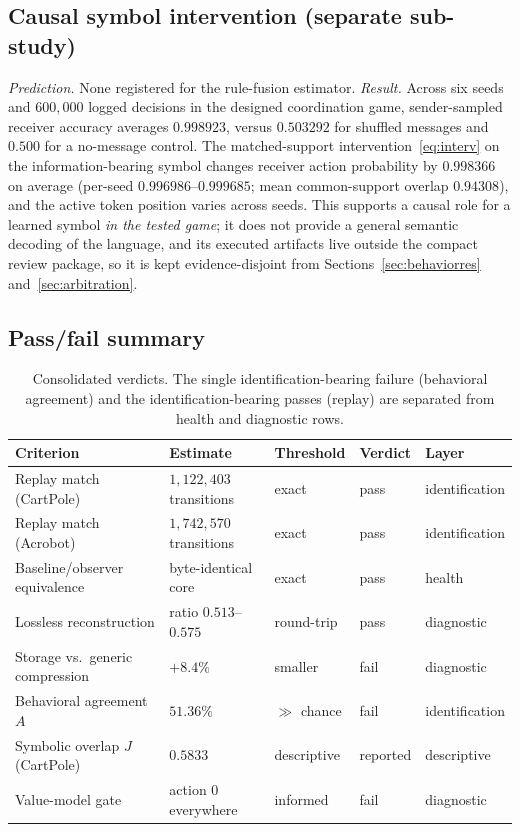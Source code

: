\documentclass[11pt]{article}
\begin{document}
\subsection{Causal symbol intervention (separate sub-study)}
\label{sec:aimres}
\emph{Prediction.} None registered for the rule-fusion estimator. \emph{Result.} Across six seeds
and $600{,}000$ logged decisions in the designed coordination game, sender-sampled receiver
accuracy averages $0.998923$, versus $0.503292$ for shuffled messages and $0.500$ for a no-message
control. The matched-support intervention~\eqref{eq:interv} on the information-bearing symbol
changes receiver action probability by $0.998366$ on average (per-seed $0.996986$--$0.999685$;
mean common-support overlap $0.94308$), and the active token position varies across seeds. This
supports a causal role for a learned symbol \emph{in the tested game}; it does not provide a
general semantic decoding of the language, and its executed artifacts live outside the compact
review package, so it is kept evidence-disjoint from Sections~\ref{sec:behaviorres}
and~\ref{sec:arbitration}.

\subsection{Pass/fail summary}
\begin{table}[t]
\centering\small
\begin{tabular}{@{}lllll@{}}
\toprule
Criterion & Estimate & Threshold & Verdict & Layer \\
\midrule
Replay match (CartPole) & $1{,}122{,}403$ transitions & exact & pass & identification \\
Replay match (Acrobot)  & $1{,}742{,}570$ transitions & exact & pass & identification \\
Baseline/observer equivalence & byte-identical core & exact & pass & health \\
Lossless reconstruction & ratio $0.513$--$0.575$ & round-trip & pass & diagnostic \\
Storage vs.\ generic compression & $+8.4\%$ & smaller & fail & diagnostic \\
Behavioral agreement $A$ & $51.36\%$ & $\gg$ chance & fail & identification \\
Symbolic overlap $J$ (CartPole) & $0.5833$ & descriptive & reported & descriptive \\
Value-model gate & action $0$ everywhere & informed & fail & diagnostic \\
\bottomrule
\end{tabular}
\caption{Consolidated verdicts. The single identification-bearing failure (behavioral agreement)
and the identification-bearing passes (replay) are separated from health and diagnostic rows.}
\label{tab:passfail}
\end{table}
\end{document}
